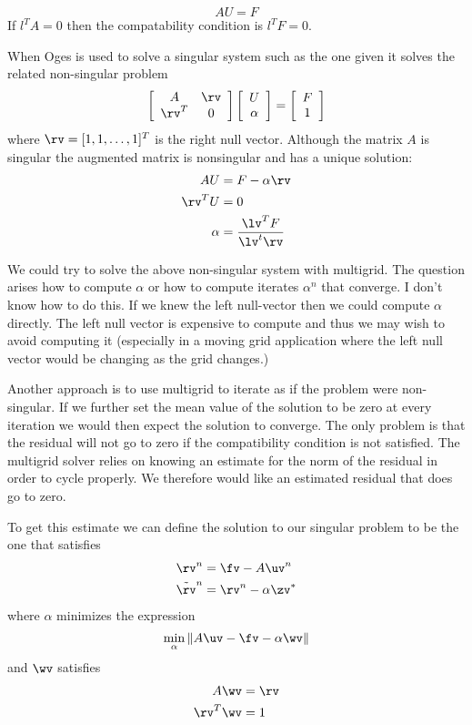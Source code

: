 \documentclass[12pt]{article}
\begin{document}
$$
    A U = F 
$$
If $l^T A =0$ then the compatability condition is $l^TF=0$. 

     
When Oges is used to solve a singular system such as the one given
it solves the related non-singular problem
\begin{equation} \label{aug}
   \left[ \begin{array}{cc}
            A  & \rv  \\
          \rv^T &  0
           \end{array}\right]
   \left[ \begin{array}{c} U \\ \alpha  \end{array}\right]
 = \left[ \begin{array}{c} F \\ 1  \end{array}\right]
\end{equation}
where $\rv=[1,1,\ldots,1]^T$ is the right null vector.
Although the matrix $A$ is singular the augmented matrix
is nonsingular and has a unique solution:
\begin{align*}
   A U &= F - \alpha \rv \\
   \rv^T U &=0 \\
 \alpha &= { \lv^T F \over \lv^t\rv } 
\end{align*}


We could try to solve the above non-singular system with multigrid. The
question arises how to compute $\alpha$ or how to compute iterates
$\alpha^n$ that converge. I don't know how to do this. 
If we knew the left null-vector then we could compute $\alpha$ directly.
The left null vector is expensive to compute and thus we may wish to avoid
computing it (especially in a moving grid application where the left null
vector would be changing as the grid changes.)

Another approach is to use multigrid to iterate as if the problem were
non-singular. If we further set the mean value of the solution to 
be zero at every iteration we would then expect the solution to 
converge. The only problem is that the residual will not go to
zero if the compatibility condition is not satisfied. 
The multigrid solver relies on knowing an estimate for the
norm of the residual in order to cycle properly. We therefore
would like an estimated residual that does go to zero. 

To get this estimate we can define the solution to our singular problem
to be the one that satisfies
\begin{align*}
    \rv^n & = \fv - A \uv^n \\    
    \tilde{\rv}^n &= \rv^n -\alpha \zv^*
\end{align*}
where $\alpha$ minimizes the expression
\[
    \min_\alpha \| A \uv - \fv - \alpha \wv \|
\]
and $\wv$ satisfies
\begin{align*}
     A \wv &= \rv \\
     \rv^T \wv &= 1
\end{align*}
\end{document}
